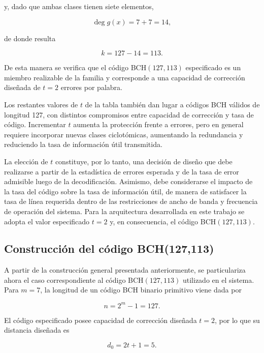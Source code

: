 \documentclass[10pt,a4paper]{article}
\begin{document}
y, dado que ambas clases tienen siete elementos,

\begin{equation}
    \deg g(x)=7+7=14,
\end{equation}

de donde resulta

\begin{equation}
    k=127-14=113.
\end{equation}

De esta manera se verifica que el código BCH$(127,113)$ especificado es un
miembro realizable de la familia y corresponde a una capacidad de corrección
diseñada de $t=2$ errores por palabra.

Los restantes valores de $t$ de la tabla también dan lugar a códigos BCH
válidos de longitud 127, con distintos compromisos entre capacidad de
corrección y tasa de código. Incrementar $t$ aumenta la protección frente a
errores, pero en general requiere incorporar nuevas clases ciclotómicas,
aumentando la redundancia y reduciendo la tasa de información útil
transmitida.

La elección de $t$ constituye, por lo tanto, una decisión de diseño que debe
realizarse a partir de la estadística de errores esperada y de la tasa de error
admisible luego de la decodificación. Asimismo, debe considerarse el impacto
de la tasa del código sobre la tasa de información útil, de manera de satisfacer
la tasa de línea requerida dentro de las restricciones de ancho de banda y
frecuencia de operación del sistema. Para la arquitectura desarrollada en este
trabajo se adopta el valor especificado $t=2$ y, en consecuencia, el código
BCH$(127,113)$.

\subsection{Construcción del código BCH(127,113)}

A partir de la construcción general presentada anteriormente, se particulariza
ahora el caso correspondiente al código BCH$(127,113)$ utilizado en el sistema.
Para $m=7$, la longitud de un código BCH binario primitivo viene dada por

\begin{equation}
    n=2^m-1=127.
\end{equation}

El código especificado posee capacidad de corrección diseñada $t=2$, por lo que
su distancia diseñada es

\begin{equation}
    d_0=2t+1=5.
\end{equation}
\end{document}

